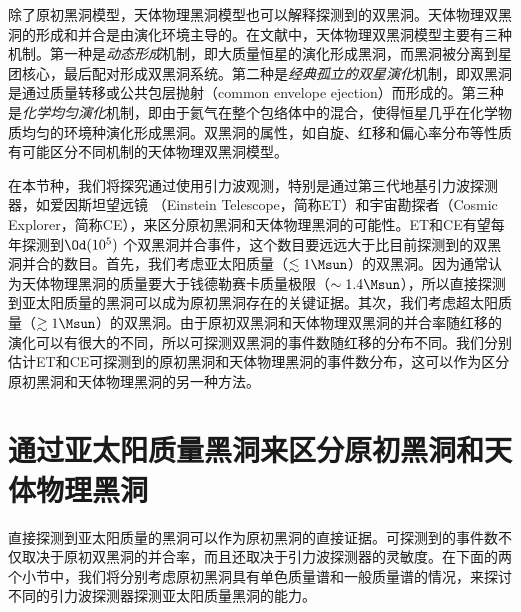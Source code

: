除了原初黑洞模型，天体物理黑洞模型也可以解释\lvc 探测到的双黑洞。天体物理双黑洞的形成和并合是由演化环境主导的。在文献中，天体物理双黑洞模型主要有三种机制。第一种是\textit{动态形成}机制，即大质量恒星的演化形成黑洞，而黑洞被分离到星团核心，最后配对形成双黑洞系统\cite{Rodriguez:2015oxa,Rodriguez:2016kxx,Park:2017zgj}。第二种是\textit{经典孤立的双星演化}机制，即双黑洞是通过质量转移或公共包层抛射（common envelope ejection）而形成的\cite{Belczynski:2014iua,Belczynski:2016obo,Woosley:2016nnw,Rodriguez:2018rmd,Choksi:2018jnq}。第三种是\textit{化学均匀演化}机制，即由于氦气在整个包络体中的混合\cite{2010AIPC.1314..291D,deMink:2016vkw}，使得恒星几乎在化学物质均匀的环境种演化形成黑洞。双黑洞的属性，如自旋\cite{Farr:2017uvj,Tiwari:2018qch,Ng:2018neg,Stevenson:2017dlk,Bogomazov:2018prw,Lopez:2018nkj,Sedda:2018nxm,Farr:2017gtv}、红移\cite{Fishbach:2018edt,Emami:2018taj,Bai:2018shq}和偏心率分布\cite{Samsing:2013kua,Samsing:2017xmd,Samsing:2017jnz,Lower:2018seu}等性质有可能区分不同机制的天体物理双黑洞模型。

在本节种，我们将探究通过使用引力波观测，特别是通过第三代地基引力波探测器，如爱因斯坦望远镜 （Einstein Telescope，简称ET）\cite{Punturo:2010zz}和宇宙勘探者（Cosmic Explorer，简称CE）\cite{Evans:2016mbw}，来区分原初黑洞和天体物理黑洞的可能性。ET和CE有望每年探测到$\Od(10^5)$ \cite{Regimbau:2016ike,Vitale:2018yhm}个双黑洞并合事件，这个数目要远远大于比目前\lvc 探测到的双黑洞并合的数目。首先，我们考虑亚太阳质量（$\lesssim 1\Msun$）的双黑洞。因为通常认为天体物理黑洞的质量要大于钱德勒赛卡质量极限（$\sim 1.4 \Msun$）\cite{Chandrasekhar:1931ftj,Chandrasekhar:1931ih}，所以直接探测到亚太阳质量的黑洞可以成为原初黑洞存在的关键证据。其次，我们考虑超太阳质量（$\gtrsim 1\Msun$）的双黑洞。由于原初双黑洞和天体物理双黑洞的并合率随红移的演化可以有很大的不同，所以可探测双黑洞的事件数随红移的分布不同。我们分别估计ET和CE可探测到的原初黑洞和天体物理黑洞的事件数分布，这可以作为区分原初黑洞和天体物理黑洞的另一种方法。


\section{\label{subsolar}通过亚太阳质量黑洞来区分原初黑洞和天体物理黑洞}
直接探测到亚太阳质量的黑洞可以作为原初黑洞的直接证据。可探测到的事件数不仅取决于原初双黑洞的并合率，而且还取决于引力波探测器的灵敏度。在下面的两个小节中，我们将分别考虑原初黑洞具有单色质量谱和一般质量谱的情况，来探讨不同的引力波探测器探测亚太阳质量黑洞的能力。

